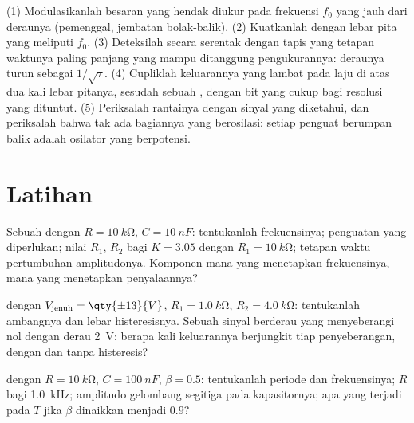 \begin{method}\label{met:b2:feedback-oscillators:method}
(1) Modulasikanlah besaran yang hendak diukur pada frekuensi $f_0$ yang jauh dari
deraunya (pemenggal, jembatan bolak-balik). (2) Kuatkanlah dengan lebar pita yang meliputi
$f_0$. (3) Deteksilah secara serentak dengan tapis yang tetapan waktunya
paling panjang yang mampu ditanggung pengukurannya: deraunya turun sebagai
$1/\sqrt\tau$. (4) Cupliklah keluarannya yang lambat pada laju di atas dua kali lebar
pitanya, sesudah sebuah , dengan bit yang cukup bagi
resolusi yang dituntut. (5) Periksalah rantainya dengan sinyal yang diketahui, dan periksalah bahwa
tak ada bagiannya yang berosilasi: setiap penguat berumpan balik adalah osilator
yang berpotensi.
\end{method}

\section{Latihan}

\begin{exercise}[$\star$]\label{exo:b2:feedback-oscillators:1}
Sebuah  dengan $R = \qty{10}{k\ohm}$, $C = \qty{10}{nF}$:
tentukanlah frekuensinya; penguatan yang diperlukan; nilai $R_1$, $R_2$ bagi $K = 3.05$ dengan $R_1 =
\qty{10}{k\ohm}$; tetapan waktu pertumbuhan amplitudonya. Komponen mana yang
menetapkan frekuensinya, mana yang menetapkan penyalaannya?
\end{exercise}

\begin{exercise}[$\star$]\label{exo:b2:feedback-oscillators:2}
 dengan $V_{\text{jenuh}} = \qty{\pm 13}{V}$, $R_1 = \qty{1.0}{k\ohm}$,
$R_2 = \qty{4.0}{k\ohm}$: tentukanlah ambangnya dan lebar histeresisnya. Sebuah sinyal berderau
yang menyeberangi nol dengan derau \qty{2}{V}: berapa kali keluarannya
berjungkit tiap penyeberangan, dengan dan tanpa histeresis?
\end{exercise}

\begin{exercise}[$\star$]\label{exo:b2:feedback-oscillators:3}
 dengan $R = \qty{10}{k\ohm}$, $C = \qty{100}{nF}$, $\beta = 0.5$:
tentukanlah periode dan frekuensinya; $R$ bagi \qty{1.0}{kHz}; amplitudo gelombang
segitiga pada kapasitornya; apa yang terjadi pada $T$ jika $\beta$ dinaikkan menjadi $0.9$?
\end{exercise}

